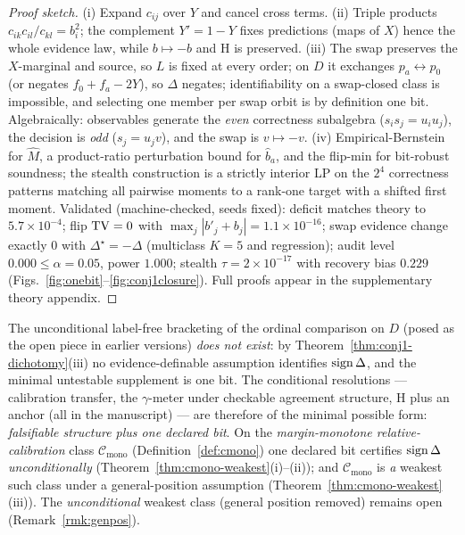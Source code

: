 \begin{proof}[Proof sketch]
(i) Expand $c_{ij}$ over $Y$ and cancel cross terms. (ii) Triple products
$c_{ik}c_{il}/c_{kl}=b_i^2$; the complement $Y'=1-Y$ fixes predictions (maps of $X$)
hence the whole evidence law, while $b\mapsto-b$ and H is preserved. (iii) The swap
preserves the $X$-marginal and source, so $L$ is fixed at every order; on $D$ it
exchanges $p_a\leftrightarrow p_0$ (or negates $f_0{+}f_a{-}2Y$), so $\Delta$ negates;
identifiability on a swap-closed class is impossible, and selecting one member per swap
orbit is by definition one bit. Algebraically: observables generate the \emph{even}
correctness subalgebra ($s_is_j=u_iu_j$), the decision is \emph{odd} ($s_j=u_jv$), and
the swap is $v\mapsto-v$. (iv) Empirical-Bernstein for $\hat M$, a product-ratio
perturbation bound for $\hat b_a$, and the flip-min for bit-robust soundness; the
stealth construction is a strictly interior LP on the $2^4$ correctness patterns
matching all pairwise moments to a rank-one target with a shifted first moment.
Validated (machine-checked, seeds fixed): deficit matches theory to $5.7\times10^{-4}$;
flip $\mathrm{TV}=0$ with $\max_j|b'_j+b_j|=1.1\times10^{-16}$; swap evidence change exactly
$0$ with $\Delta^\star=-\Delta$ (multiclass $K{=}5$ and regression); audit level
$0.000\le\alpha{=}0.05$, power $1.000$; stealth $\tau=2\times10^{-17}$ with recovery
bias $0.229$ (Figs.~\ref{fig:onebit}--\ref{fig:conj1closure}).
Full proofs appear in the supplementary theory appendix.
\end{proof}

\begin{conjecture}\label{conj:gen}
The unconditional label-free bracketing of the ordinal comparison on $D$ (posed as the
open piece in earlier versions) \emph{does not exist}: by
Theorem~\ref{thm:conj1-dichotomy}(iii) no evidence-definable assumption identifies
$\operatorname{sign}\Delta$, and the minimal untestable supplement is one bit. The conditional
resolutions --- calibration transfer, the $\gamma$-meter under checkable agreement
structure, H plus an anchor (all in the manuscript) --- are therefore of the minimal
possible form: \emph{falsifiable structure plus one declared bit}. On the
\emph{margin-monotone relative-calibration} class $\mathcal C_{\mathrm{mono}}$
(Definition~\ref{def:cmono}) one declared bit certifies $\operatorname{sign}\Delta$ \emph{unconditionally}
(Theorem~\ref{thm:cmono-weakest}(i)--(ii)); and $\mathcal C_{\mathrm{mono}}$ is \emph{a} weakest
such class under a general-position assumption (Theorem~\ref{thm:cmono-weakest}(iii)). The
\emph{unconditional} weakest class (general position removed) remains open
(Remark~\ref{rmk:genpos}).
\end{conjecture}

